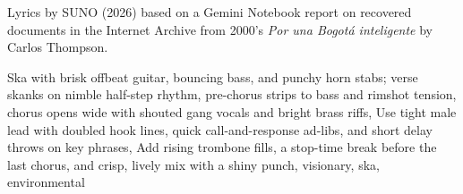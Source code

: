 
\begin{notes}
Lyrics by SUNO (2026) based on a Gemini Notebook report on recovered documents in the Internet Archive from 2000's \emph{Por una Bogotá inteligente} by Carlos Thompson. 
\end{notes}
\begin{style}
Ska with brisk offbeat guitar, bouncing bass, and punchy horn stabs; verse skanks on nimble half-step rhythm, pre-chorus strips to bass and rimshot tension, chorus opens wide with shouted gang vocals and bright brass riffs, Use tight male lead with doubled hook lines, quick call-and-response ad-libs, and short delay throws on key phrases, Add rising trombone fills, a stop-time break before the last chorus, and crisp, lively mix with a shiny punch, visionary, ska, environmental
\end{style}
